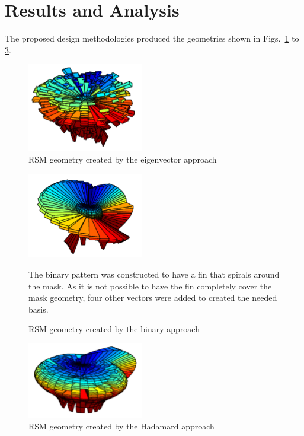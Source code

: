 \documentclass[3p,times]{elsarticle}
\begin{document}
\section{Results and Analysis}
The proposed design methodologies produced the geometries shown in Figs.~\ref{fig:EVGeo} to \ref{fig:HadGeo}.
\begin{figure}[ht!]
\centering
\includegraphics[width={2.0in}]{../figs/EVGeo.pdf}
\caption{RSM geometry created by the eigenvector approach}
\label{fig:EVGeo}
\end{figure}
\begin{figure}[ht!]
\includegraphics[width={2.0in}]{../figs/BiGeo.pdf}
\centering
\caption{RSM geometry created by the binary approach}
\label{fig:BiGeo}
The binary pattern was constructed to have a fin that spirals around the mask.  As it is not possible to have the fin completely cover the mask geometry, four other vectors were
added to created the needed basis.
\end{figure}
\begin{figure}[ht!]
\centering
\includegraphics[width={2.0in}]{../figs/HadGeo.pdf}
\caption{RSM geometry created by the Hadamard approach}
\label{fig:HadGeo}
\end{figure}
\end{document}
